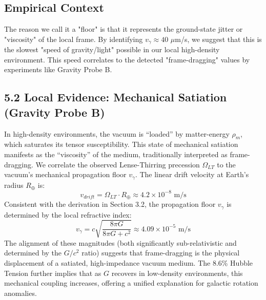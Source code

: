 \documentclass[12pt,a4paper]{article}
\begin{document}
\subsection{Empirical Context}
The reason we call it a "floor" is that it represents the ground-state jitter or "viscosity" of the local frame. By identifying $v_\gamma \approx 40$ $\mu$m/s, we suggest that this is the slowest "speed of gravity/light" possible in our local high-density environment. This speed correlates to the detected "frame-dragging" values by experiments like Gravity Probe B.


\subsection{5.2 Local Evidence: Mechanical Satiation (Gravity Probe B)}
In high-density environments, the vacuum is ``loaded'' by matter-energy $\rho_m$, which saturates its tensor susceptibility. This state of mechanical satiation manifests as the ``viscosity'' of the medium, traditionally interpreted as frame-dragging. We correlate the observed Lense-Thirring precession $\Omega_{LT}$ to the vacuum's mechanical propagation floor $v_{\gamma}$. The linear drift velocity at Earth's radius $R_{\oplus}$ is:
\begin{equation}
v_{drift} = \Omega_{LT} \cdot R_{\oplus} \approx 4.2 \times 10^{-8} \text{ m/s}
\end{equation}
Consistent with the derivation in Section 3.2, the propagation floor $v_{\gamma}$ is determined by the local refractive index:
\begin{equation}
v_{\gamma} = c \sqrt{\displaystyle\frac{8\pi G}{8\pi G + c^2}} \approx 4.09 \times 10^{-5} \text{ m/s}
\end{equation}
The alignment of these magnitudes (both significantly sub-relativistic and determined by the $G/c^2$ ratio) suggests that frame-dragging is the physical displacement of a satiated, high-impedance vacuum medium. The 8.6\% Hubble Tension further implies that as $G$ recovers in low-density environments, this mechanical coupling increases, offering a unified explanation for galactic rotation anomalies.
\end{document}
